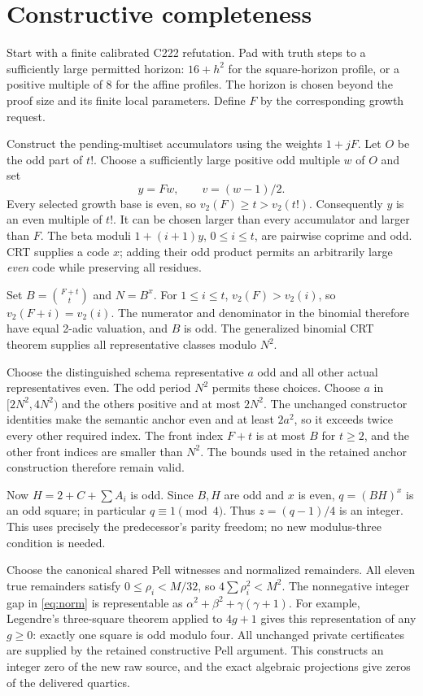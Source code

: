 \documentclass[11pt]{article}
\theoremstyle{remark}\newtheorem{remark}[theorem]{Remark}
\begin{document}
\section{Constructive completeness}

Start with a finite calibrated C222 refutation. Pad with truth steps to
a sufficiently large permitted horizon: $16+h^2$ for the square-horizon
profile, or a positive multiple of 8 for the affine profiles.
The horizon is chosen beyond the proof size and its finite local
parameters. Define $F$ by the corresponding growth request.

Construct the pending-multiset accumulators using the weights $1+jF$.
Let $O$ be the odd part of $t!$. Choose a sufficiently large positive
odd multiple $w$ of $O$ and set
\[
                y=Fw,\qquad v=(w-1)/2.
\]
Every selected growth base is even, so $v_2(F)\ge t>v_2(t!)$.
Consequently $y$ is an even multiple of $t!$. It can be chosen larger
than every accumulator and larger than $F$. The beta moduli
$1+(i+1)y$, $0\le i\le t$, are pairwise coprime and odd. CRT supplies
a code $x$; adding their odd product permits an arbitrarily large
\emph{even} code while preserving all residues.

Set $B=\binom{F+t}{t}$ and $N=B^x$. For $1\le i\le t$,
$v_2(F)>v_2(i)$, so $v_2(F+i)=v_2(i)$. The numerator and denominator
in the binomial therefore have equal 2-adic valuation, and $B$ is odd.
The generalized binomial CRT theorem supplies all representative
classes modulo $N^2$.

Choose the distinguished schema representative $a$ odd and all other
actual representatives even. The odd period $N^2$ permits these choices.
Choose $a$ in $[2N^2,4N^2)$ and the others positive and at most $2N^2$.
The unchanged constructor identities make the semantic anchor even
and at least $2a^2$, so it exceeds twice every other required index.
The front index $F+t$ is at most $B$ for $t\ge2$, and the other front
indices are smaller than $N^2$. The bounds used in the retained anchor
construction therefore remain valid.

Now $H=2+C+\sum A_i$ is odd. Since $B,H$ are odd and $x$ is even,
$q=(BH)^x$ is an odd square; in particular $q\equiv1\pmod4$.
Thus $z=(q-1)/4$ is an integer. This uses precisely the predecessor's
parity freedom; no new modulus-three condition is needed.

Choose the canonical shared Pell witnesses and normalized remainders.
All eleven true remainders satisfy $0\le\rho_i<M/32$, so
$4\sum\rho_i^2<M^2$. The nonnegative integer gap in \eqref{eq:norm}
is representable as $\alpha^2+\beta^2+\gamma(\gamma+1)$.
For example, Legendre's three-square theorem applied to $4g+1$ gives
this representation of any $g\ge0$: exactly one square is odd modulo
four. All unchanged private certificates are supplied by the retained
constructive Pell argument. This constructs an integer zero of the
new raw source, and the exact algebraic projections give zeros of the
delivered quartics.
\end{document}
